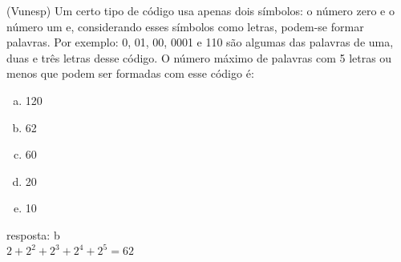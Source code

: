 \begin{ex}
(Vunesp) Um certo tipo de código usa apenas dois símbolos: o número zero e o número um e, considerando esses símbolos como letras, podem-se formar palavras. Por exemplo: 0, 01, 00, 0001 e 110 são algumas das palavras de uma, duas e três letras desse código. O número máximo de palavras com 5 letras ou menos que podem ser formadas com esse código é:
   \begin{enumerate}[(a)]
   \item 120
   \item 62
   \item 60
   \item 20
   \item 10
   \end{enumerate}
     \begin{sol}
       resposta: b \\
       $2+2^2+2^3+2^4+2^5=62$
     \end{sol}
\end{ex}